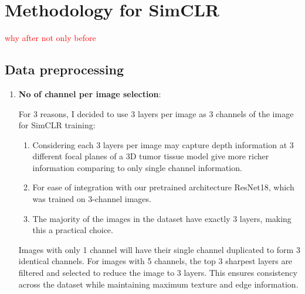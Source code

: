 \chapter{Methodology for SimCLR}\label{ch: Methodology for SimCLR}

\textcolor{red}{why after not only before}
\section{Data preprocessing} \label{sec:data preprocessing}
\begin{enumerate}
  \item \textbf{No of channel per image selection}:

   For 3 reasons, I decided to use 3 layers per image as 3 channels of the image for SimCLR training:
  \begin{enumerate}
      \item Considering each 3 layers per image may  capture depth information at 3 different focal planes of a 3D tumor tissue model give more richer information
      comparing to only single channel information.
      \item For ease of integration with our pretrained architecture ResNet18, which was trained on 3-channel images.
      \item The majority of the images in the dataset have exactly 3 layers, making this a practical choice.
  \end{enumerate}
   Images with only 1 channel will have their single channel duplicated to form 3 identical channels. For images with 5 channels, the top 3 sharpest
   layers are filtered and selected to reduce the image to 3 layers. This ensures consistency across the dataset while maintaining maximum texture and edge 
   information.


\end{enumerate}
